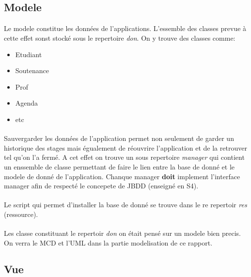 \documentclass[a4paper,10pt]{report}
\begin{document}
		\subsection{Modele}

			\paragraph*{}
			Le modele constitue les données de l'applications. L'essemble des classes prevue à cette effet sonst stocké sous le repertoire \textit{don}. On y trouve des classes comme:
			\begin{itemize}
				\item Etudiant
				\item Soutenance
				\item Prof
				\item Agenda
				\item etc
			\end{itemize} 

			\paragraph*{}
			Sauvergarder les données de l'application permet non seulement de garder un historique des stages mais égualement de réouvrire l'application et de la retrouver tel qu'on l'a fermé. A cet effet on trouve un sous repertoire \textit{manager} qui contient un enssemble de classe permettant de faire le lien entre la base de donné et le modele de donné de l'application. Chanque manager \textbf{doit} implement l'interface manager afin de respecté le concepete de JBDD (enseigné en S4).

		\paragraph*{}
		Le script qui permet d'installer la base de donné se trouve dans le re repertoir \textit{res} (ressource).

			\paragraph*{}
			Les classe constituant le repertoir \textit{don} on était pensé sur un modele bien precis. On verra le MCD et l'UML dans la partie modelisation de ce rapport.

		\subsection{Vue}
\end{document}
